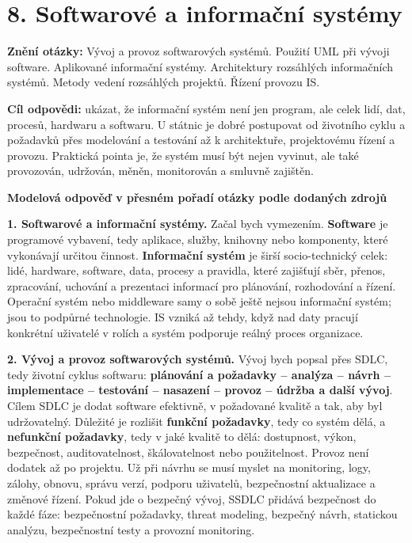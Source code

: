 \documentclass[11pt,a4paper]{article}
\newcommand{\otazka}[3]{\section*{#1}\addcontentsline{toc}{section}{#1}\noindent\textbf{Znění otázky:} #2\par\medskip}
\newcommand{\itbox}[1]{\medskip\noindent\colorbox{black!6}{\parbox{\dimexpr\linewidth-2\fboxsep}{#1}}\medskip}
\begin{document}
\newpage

\otazka{8. Softwarové a informační systémy}{Vývoj a provoz softwarových systémů. Použití UML při vývoji software. Aplikované informační systémy. Architektury rozsáhlých informačních systémů. Metody vedení rozsáhlých projektů. Řízení provozu IS.}{PB007, PV028}

\itbox{\textbf{Cíl odpovědi:} ukázat, že informační systém není jen program, ale celek lidí, dat, procesů, hardwaru a softwaru. U státnic je dobré postupovat od životního cyklu a požadavků přes modelování a testování až k architektuře, projektovému řízení a provozu. Praktická pointa je, že systém musí být nejen vyvinut, ale také provozován, udržován, měněn, monitorován a smluvně zajištěn.}

\begin{greenbox}
\textbf{Modelová odpověď v přesném pořadí otázky podle dodaných zdrojů}

\textbf{1. Softwarové a informační systémy.} Začal bych vymezením. \textbf{Software} je programové vybavení, tedy aplikace, služby, knihovny nebo komponenty, které vykonávají určitou činnost. \textbf{Informační systém} je širší socio-technický celek: lidé, hardware, software, data, procesy a pravidla, které zajišťují sběr, přenos, zpracování, uchování a prezentaci informací pro plánování, rozhodování a řízení. Operační systém nebo middleware samy o sobě ještě nejsou informační systém; jsou to podpůrné technologie. IS vzniká až tehdy, když nad daty pracují konkrétní uživatelé v rolích a systém podporuje reálný proces organizace.

\textbf{2. Vývoj a provoz softwarových systémů.} Vývoj bych popsal přes SDLC, tedy životní cyklus softwaru: \textbf{plánování a požadavky -- analýza -- návrh -- implementace -- testování -- nasazení -- provoz -- údržba a další vývoj}. Cílem SDLC je dodat software efektivně, v požadované kvalitě a tak, aby byl udržovatelný. Důležité je rozlišit \textbf{funkční požadavky}, tedy co systém dělá, a \textbf{nefunkční požadavky}, tedy v jaké kvalitě to dělá: dostupnost, výkon, bezpečnost, auditovatelnost, škálovatelnost nebo použitelnost. Provoz není dodatek až po projektu. Už při návrhu se musí myslet na monitoring, logy, zálohy, obnovu, správu verzí, podporu uživatelů, bezpečnostní aktualizace a změnové řízení. Pokud jde o bezpečný vývoj, SSDLC přidává bezpečnost do každé fáze: bezpečnostní požadavky, threat modeling, bezpečný návrh, statickou analýzu, bezpečnostní testy a provozní monitoring.


\end{greenbox}
\end{document}
